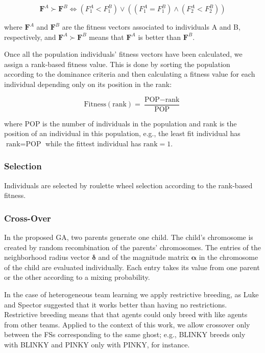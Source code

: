 \documentclass[journal]{IEEEtran}
\begin{document}
\begin{equation}
\label{eq:ordering}
	\mathbf{F}^A \succ \mathbf{F}^B \iff (F_1^A < F_1^B) \lor ((F_1^A = F_1^B) \land (F_2^A < F_2^B))
\end{equation}

where $\mathbf{F}^A$ and $\mathbf{F}^B$ are the fitness vectors associated to individuals A and B, respectively, and $\mathbf{F}^A \succ \mathbf{F}^B$ means that $\mathbf{F}^A$ is better than $\mathbf{F}^B$.

Once all the population individuals' fitness vectors have been calculated, we assign a rank-based fitness value. This is done by sorting the population according to the dominance criteria and then calculating a fitness value for each individual depending only on its position in the rank:

\begin{equation}
\label{eq:rankFitness}
	\text{Fitness}(\text{rank}) = \frac{\text{POP} - \text{rank}}{\text{POP}}
\end{equation}

where POP is the number of individuals in the population and rank is the position of an individual in this population, e.g., the least fit individual has $\text{rank} = \text{POP}$ while the fittest individual has $\text{rank} = 1$.

\subsubsection{Selection}
Individuals are selected by roulette wheel selection according to the rank-based fitness.

\subsubsection{Cross-Over}
In the proposed GA, two parents generate one child. The child's chromosome is created by random recombination of the parents' chromosomes. The entries of the neighborhood radius vector $\boldsymbol\delta$ and of the magnitude matrix $\boldsymbol\alpha$ in the chromosome of the child are evaluated individually. Each entry takes its value from one parent or the other according to a mixing probability.

In the case of heterogeneous team learning we apply restrictive
breeding, as Luke and Spector \cite{Luke1996} suggested that it works
better than having no restrictions. Restrictive breeding means that
that agents could only breed with like agents from other
teams. Applied to the context of this work, we allow crossover only
between the FSs corresponding to the same ghost; e.g., BLINKY breeds
only with BLINKY and PINKY only with PINKY, for instance.
\end{document}
